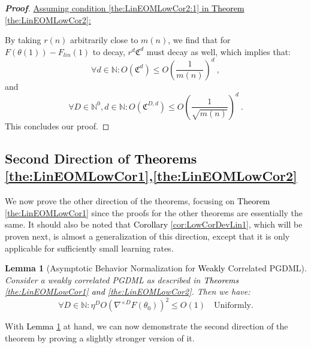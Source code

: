 \documentclass{article} %
\newtheorem{lemma}[theorem]{Lemma}
\begin{document}
\begin{proof}[\textbf{Proof}]
\underline{Assuming condition \ref{the:LinEOMLowCor2:1} in \textcolor{black}{Theorem} \ref{the:LinEOMLowCor2}:}

By taking \(r(n)\) arbitrarily close to \(m(n)\), we find that for \(F\left(\theta\left(1\right)\right)-F_{lin}\left(1\right)\) to decay, \(r^{d}\mathfrak{C}^{d}\) must decay as well, which implies that:
\begin{equation}
\forall d\in\mathbb{N}:O\left(\mathfrak{C}^{d}\right)\leq O\left(\frac{1}{m\left(n\right)}\right)^{d} \ ,
\end{equation}
and
\begin{equation}
\forall D\in\mathbb{N}^{0},d\in\mathbb{N}:O\left(\mathfrak{C}^{D,d}\right)\leq O\left(\frac{1}{\sqrt{m\left(n\right)}}\right)^{d} \ .
\end{equation}
This concludes our proof.
\end{proof}

\subsection{Second Direction of \textcolor{black}{Theorems} \ref{the:LinEOMLowCor1},\ref{the:LinEOMLowCor2}}
\label{Zap:sec:LowCorDerLin1}

We now prove the other direction of the theorems, focusing on \textcolor{black}{Theorem} \ref{the:LinEOMLowCor1} since the proofs for the other theorems are essentially the same. It should also be noted that \textcolor{black}{Corollary} \ref{cor:LowCorDevLin1}, which will be proven next, is almost a generalization of this direction, except that it is only applicable for sufficiently small learning rates.

\begin{lemma}[Asymptotic Behavior Normalization for \textcolor{black}{Weakly} Correlated PGDML]
\label{Zap:lem:AsyBehavior}
\textup{
Consider a weakly correlated PGDML as described in \textcolor{black}{Theorems} \ref{the:LinEOMLowCor1}\textcolor{black}{ and} \ref{the:LinEOMLowCor2}. Then we have:
\begin{equation}
\forall D\in\mathbb{N}:\eta^{D}O\left(\nabla^{\times D}F\left(\theta_{0}\right)\right)^{2}\leq O\left(1\right)\quad\text{Uniformly.}
\end{equation}
}
\end{lemma}

With \textcolor{black}{Lemma} \ref{Zap:lem:AsyBehavior} at hand, we can now demonstrate the second direction of the theorem by proving a slightly stronger version of it.
\end{document}
